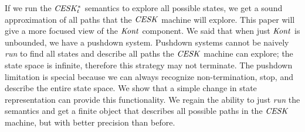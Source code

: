 If we run the $\mathit{CESK^*_t}$ semantics to explore all possible states, we get a sound approximation of all paths that the $\mathit{CESK}$ machine will explore.
%
This paper will give a more focused view of the $\mathit{Kont}$ component.
%
We said that when just $\mathit{Kont}$ is unbounded, we have a pushdown system.
%
Pushdown systems cannot be naively \emph{run} to find all states and describe all paths the $\mathit{CESK}$ machine can explore; the state space is infinite, therefore this strategy may not terminate.
%
The pushdown limitation is special because we can always recognize non-termination, stop, and describe the entire state space.
%
We show that a simple change in state representation can provide this functionality.
%
We regain the ability to just \emph{run} the semantics and get a finite object that describes all possible paths in the $\mathit{CESK}$ machine, but with better precision than before.
